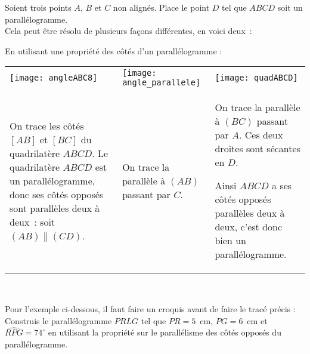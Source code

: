 \begin{methode*1}

\begin{exemple*1}
Soient trois points $A$, $B$ et $C$ non alignés. Place le point $D$ tel que $ABCD$ soit un parallélogramme.\\[0.5em]
Cela peut être résolu de plusieurs façons différentes, en voici deux :

En utilisant une propriété des côtés d'un parallélogramme :

\begin{tabularx}{\textwidth}{X|X|X}
 \qquad \texttt{[image: angleABC8]} & \texttt{[image: angle\_parallele]} & \texttt{[image: quadABCD]} \\ 
 On trace les côtés $[AB]$ et $[BC]$ du quadrilatère $ABCD$. Le quadrilatère $ABCD$ est un parallélogramme, donc ses côtés opposés sont parallèles deux à deux : soit $(AB) \parallel (CD)$. & On trace la parallèle à $(AB)$ passant par $C$. & On trace la parallèle à $(BC)$ passant par $A$. Ces deux droites sont sécantes en $D$.
 
 Ainsi $ABCD$ a ses côtés opposés parallèles deux à deux, c'est donc bien un parallélogramme. \\
\end{tabularx} \\[1em]

\end{exemple*1}

Pour l'exemple ci-dessous, il faut faire un croquis avant de faire le tracé précis :\\[-2.5em]

\exercice
Construis le parallélogramme $PRLG$ tel que $PR = 5$ cm, $PG = 6$ cm et  $\widehat{RPG} = 74^\circ$ en utilisant la propriété sur le parallélisme des côtés opposés du parallélogramme.

\end{methode*1}

\newpage





